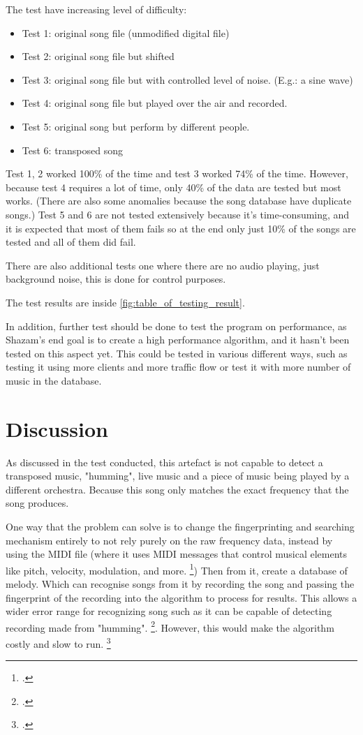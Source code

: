 The test have increasing level of difficulty:
\label{chapter:test_methods:methods}
\begin{itemize}
    \item Test 1: original song file (unmodified digital file)
    \item Test 2: original song file but shifted 
    \item Test 3: original song file but with controlled level of noise. (E.g.: a sine wave)
    \item Test 4: original song file but played over the air and recorded.
    \item Test 5: original song but perform by different people.
    \item Test 6: transposed song \label{t:test_transposed}
\end{itemize}

Test 1, 2 worked 100\% of the time and test 3 worked 74\% of the time. However, because test 4 requires a lot of time, only 40\% of the data are tested but most works. (There are also some anomalies because the song database have duplicate songs.) Test 5 and 6 are not tested extensively because it's time-consuming, and it is expected that most of them fails so at the end only just 10\% of the songs are tested and all of them did fail.

There are also additional tests one where there are no audio playing, just background noise, this is done for control purposes.

The test results are inside \autoref{fig:table_of_testing_result}.

In addition, further test should be done to test the program on performance, as Shazam\trademark's end goal is to create a high performance algorithm, and it hasn't been tested on this aspect yet. This could be tested in various different ways, such as testing it using more clients and more traffic flow or test it with more number of music in the database. 

\chapter{Discussion}

As discussed in the test conducted, this artefact is not capable to detect a transposed music, "humming", live music and a piece of music being played by a different orchestra. Because this song only matches the exact frequency that the song produces. 

One way that the problem can solve is to change the fingerprinting and searching mechanism entirely to not rely purely on the raw frequency data, instead by using the MIDI file (where it uses MIDI messages that control musical elements like pitch, velocity, modulation, and more. \footcite{anthony_what_2025}) Then from it, create a database of melody. Which can recognise songs from it by recording the song and passing the fingerprint of the recording into the algorithm to process for results. This allows a wider error range for recognizing song such as it can be capable of detecting recording made from "humming". \footcite{ghias_query_1995}. However, this would make the algorithm costly and slow to run. \footcite{yang_music_2001}

